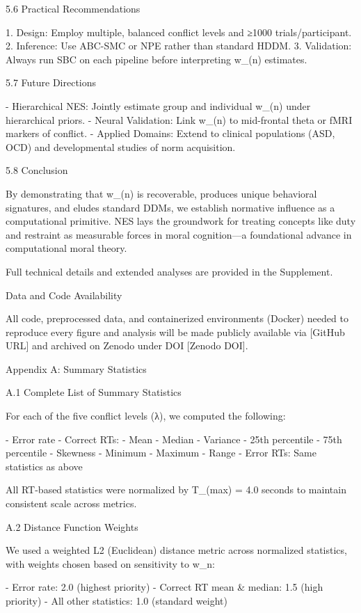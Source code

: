 5.6 Practical Recommendations

1.  Design: Employ multiple, balanced conflict levels and ≥1000
    trials/participant.
2.  Inference: Use ABC-SMC or NPE rather than standard HDDM.
3.  Validation: Always run SBC on each pipeline before interpreting
    w_(n) estimates.

5.7 Future Directions

- Hierarchical NES: Jointly estimate group and individual w_(n) under
  hierarchical priors.
- Neural Validation: Link w_(n) to mid-frontal theta or fMRI markers of
  conflict.
- Applied Domains: Extend to clinical populations (ASD, OCD) and
  developmental studies of norm acquisition.

5.8 Conclusion

By demonstrating that w_(n) is recoverable, produces unique behavioral
signatures, and eludes standard DDMs, we establish normative influence
as a computational primitive. NES lays the groundwork for treating
concepts like duty and restraint as measurable forces in moral
cognition—a foundational advance in computational moral theory.

Full technical details and extended analyses are provided in the
Supplement.

Data and Code Availability

All code, preprocessed data, and containerized environments (Docker)
needed to reproduce every figure and analysis will be made publicly
available via [GitHub URL] and archived on Zenodo under DOI [Zenodo
DOI].

Appendix A: Summary Statistics

A.1 Complete List of Summary Statistics

For each of the five conflict levels (λ), we computed the following:

- Error rate
- Correct RTs:
  - Mean
  - Median
  - Variance
  - 25th percentile
  - 75th percentile
  - Skewness
  - Minimum
  - Maximum
  - Range
- Error RTs: Same statistics as above

All RT-based statistics were normalized by T_(max) = 4.0 seconds to
maintain consistent scale across metrics.

A.2 Distance Function Weights

We used a weighted L2 (Euclidean) distance metric across normalized
statistics, with weights chosen based on sensitivity to w_n:

- Error rate: 2.0 (highest priority)
- Correct RT mean & median: 1.5 (high priority)
- All other statistics: 1.0 (standard weight)


